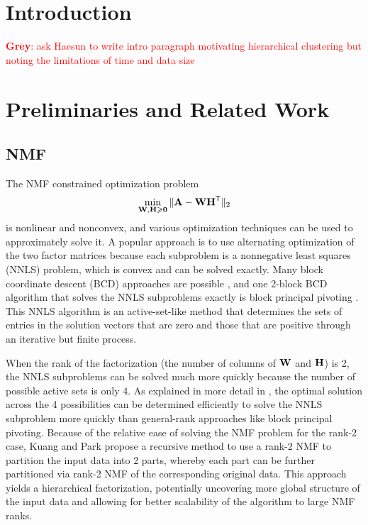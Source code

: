 \documentclass[conference,compsoc]{IEEEtran}
\newcommand{\GB}[1]{\textcolor{red}{\textbf{Grey}: #1}}
\begin{document}

\section{Introduction}

\GB{ask Haesun to write intro paragraph motivating hierarchical clustering but noting the limitations of time and data size}

\section{Preliminaries and Related Work}
\label{sec:prelim}

\subsection{NMF}

The NMF constrained optimization problem
$$\min_{\M{W},\M{H}\geq \M{0}} \|\M{A} - \M{W}\M{H}^\Tra\|_2$$
is nonlinear and nonconvex, and various optimization techniques can be used to approximately solve it.
A popular approach is to use alternating optimization of the two factor matrices because each subproblem is a nonnegative least squares (NNLS) problem, which is convex and can be solved exactly.
Many block coordinate descent (BCD) approaches are possible \cite{KHP14}, and one 2-block BCD algorithm that solves the NNLS subproblems exactly is block principal pivoting \cite{KP11}.
This NNLS algorithm is an active-set-like method that determines the sets of entries in the solution vectors that are zero and those that are positive through an iterative but finite process.

When the rank of the factorization (the number of columns of $\M{W}$ and $\M{H}$) is 2, the NNLS subproblems can be solved much more quickly because the number of possible active sets is only 4.
As explained in more detail in , the optimal solution across the 4 possibilities can be determined efficiently to solve the NNLS subproblem more quickly than general-rank approaches like block principal pivoting.
Because of the relative ease of solving the NMF problem for the rank-2 case, Kuang and Park \cite{KP13} propose a recursive method to use a rank-2 NMF to partition the input data into 2 parts, whereby each part can be further partitioned via rank-2 NMF of the corresponding original data.
This approach yields a hierarchical factorization, potentially uncovering more global structure of the input data and allowing for better scalability of the algorithm to large NMF ranks.
\end{document}
